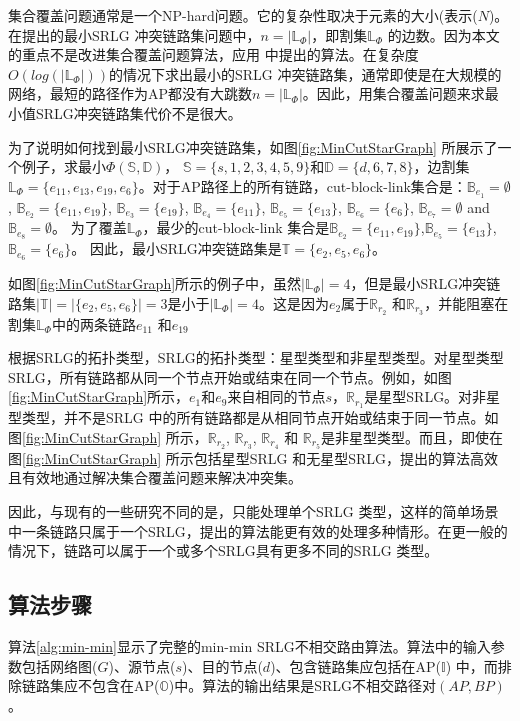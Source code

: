 集合覆盖问题通常是一个NP-hard问题。它的复杂性取决于元素的大小(表示($N$)。 在提出的最小SRLG 冲突链路集问题中，$n=|\mathbb{L}_{\Phi}|$，即割集$\mathbb{L}_{\Phi}$ 的边数。因为本文的重点不是改进集合覆盖问题算法，应用\cite{chvatal1979greedy} 中提出的算法。在复杂度$O(log(|\mathbb{L}_{\Phi}|))$的情况下求出最小的SRLG 冲突链路集，通常即使是在大规模的网络，最短的路径作为AP都没有大跳数$n=|\mathbb{L}_{\Phi}|$。因此，用集合覆盖问题来求最小值SRLG冲突链路集代价不是很大。

为了说明如何找到最小SRLG冲突链路集，如图\ref{fig:MinCutStarGraph} 所展示了一个例子，求最小$\Phi(\mathbb{S},\mathbb{D})$， $\mathbb{S}=\{s, 1, 2, 3, 4, 5, 9\}$和$\mathbb{D}=\{d, 6, 7, 8\}$，边割集$\mathbb{L}_{\Phi}=\{e_{11},e_{13},e_{19},e_{6}\}$。对于AP路径上的所有链路，cut-block-link集合是：$\mathbb{B}_{e_1}=\emptyset$, $\mathbb{B}_{e_2}=\{e_{11},e_{19}\}$, $\mathbb{B}_{e_3}=\{e_{19}\}$, $\mathbb{B}_{e_4}=\{e_{11}\}$, $\mathbb{B}_{e_5}=\{e_{13}\}$, $\mathbb{B}_{e_6}=\{e_6\}$, $\mathbb{B}_{e_7}=\emptyset$ and $\mathbb{B}_{e_8}=\emptyset$。 为了覆盖$\mathbb{L}_{\Phi}$，最少的cut-block-link 集合是$\mathbb{B}_{e_2}=\{e_{11},e_{19}\}$,$\mathbb{B}_{e_5}=\{e_{13}\}$,$\mathbb{B}_{e_6}=\{e_6\}$。 因此，最小SRLG冲突链路集是$\mathbb{T}=\{e_2, e_5, e_6 \}$。

如图\ref{fig:MinCutStarGraph}所示的例子中，虽然$|\mathbb{L}_{\Phi}|=4$，但是最小SRLG冲突链路集$|\mathbb{T}|=|\{e_2, e_5, e_6 \}|=3$是小于$|\mathbb{L}_{\Phi}|=4$。这是因为$e_2$属于$\mathbb{R}_{r_2}$ 和$\mathbb{R}_{r_3}$，并能阻塞在割集$\mathbb{L}_{\Phi}$中的两条链路$e_{11}$ 和$e_{19}$


根据SRLG的拓扑类型\cite{datta2008graph}，SRLG的拓扑类型：星型类型和非星型类型。对星型类型SRLG，所有链路都从同一个节点开始或结束在同一个节点。例如，如图\ref{fig:MinCutStarGraph}所示，$e_1$和$e_9$来自相同的节点$s$，$\mathbb{R}_{r_1}$是星型SRLG。对非星型类型，并不是SRLG 中的所有链路都是从相同节点开始或结束于同一节点。如图\ref{fig:MinCutStarGraph} 所示，$\mathbb{R}_{r_2}$, $\mathbb{R}_{r_3}$, $\mathbb{R}_{r_4}$ 和 $\mathbb{R}_{r_5}$是非星型类型。而且，即使在图\ref{fig:MinCutStarGraph} 所示包括星型SRLG 和无星型SRLG，提出的算法高效且有效地通过解决集合覆盖问题来解决冲突集。


因此，与现有的一些研究不同的是，\cite{datta2008graph}只能处理单个SRLG 类型，这样的简单场景中一条链路只属于一个SRLG，提出的算法能更有效的处理多种情形。在更一般的情况下，链路可以属于一个或多个SRLG具有更多不同的SRLG 类型。
\subsection{算法步骤}
算法\ref{alg:min-min}显示了完整的min-min SRLG不相交路由算法。算法中的输入参数包括网络图($G$)、源节点($s$)、目的节点($d$)、包含链路集应包括在AP($\mathbb{I}$) 中，而排除链路集应不包含在AP($\mathbb{O}$)中。算法的输出结果是SRLG不相交路径对$(AP,BP)$。

